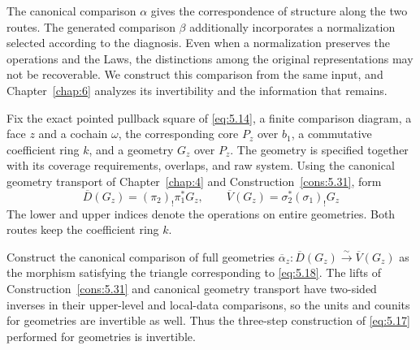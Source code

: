 The canonical comparison $\alpha$ gives the correspondence of structure along the two
routes. The generated comparison $\beta$ additionally incorporates a normalization
selected according to the diagnosis. Even when a normalization preserves the operations and
the Laws, the distinctions among the original representations may not be recoverable. We
construct this comparison from the same input, and Chapter~\ref{chap:6} analyzes its
invertibility and the information that remains.

\begin{construction}\label{cons:5.37}

Fix the exact pointed pullback square of \eqref{eq:5.14}, a finite comparison
diagram, a face $z$ and a cochain $\omega$, the corresponding core $P_z$ over $b_1$,
a commutative coefficient ring $k$, and a geometry $G_z$ over $P_z$.
The geometry is specified together with its coverage requirements, overlaps, and raw system.
Using the canonical geometry transport of Chapter~\ref{chap:4} and
Construction~\ref{cons:5.31}, form
\begin{equation*}
\overline D(G_z)=(\pi_2)_!\pi_1^*G_z,
\qquad
\overline V(G_z)=\sigma_2^*(\sigma_1)_!G_z
\tag{5.43}\label{eq:5.43}
\end{equation*}
The lower and upper indices denote the operations on entire geometries. Both routes keep
the coefficient ring $k$.

Construct the canonical comparison of full geometries
$\overline\alpha_z:\overline D(G_z)\xrightarrow{\sim}\overline V(G_z)$ as the morphism
satisfying the triangle corresponding to \eqref{eq:5.18}.
The lifts of Construction~\ref{cons:5.31} and canonical geometry transport have
two-sided inverses in their upper-level and local-data comparisons, so the units
and counits for geometries are invertible as well.
Thus the three-step construction of \eqref{eq:5.17} performed for geometries is invertible.


\end{construction}
